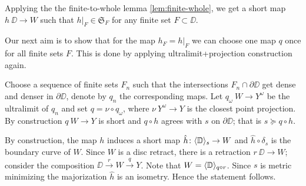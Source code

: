 Applying the the finite-to-whole lemma \ref{lem:finite-whole},
we get a short map $h\:\DD\to W$ such that $h|_F\in \mathfrak{S}_F$
for any finite set $F\subset \DD$.

Our next aim is to show that for the map $h_F=h|_F$ we can choose one map $q$ once for all finite sets $F$.
This is done by applying ultralimit+projection construction again.

Choose a sequence of finite sets $F_n$ such that the intersections $F_n\cap\partial \DD$ get dense and denser in $\partial \DD$, denote by $q_n$ the corresponding maps.
Let $q_\omega\:W\to Y^\omega$ be the ultralimit of $q_n$ and set $q=\nu\circ q_\omega$,
where $\nu\:Y^\omega\to Y$ is the closest point projection.
By construction $q\:W\to Y$ is short and $q\circ h$ agrees with $s$ on $\partial \DD$;
that is $s\succcurlyeq q\circ h$.

By construction, the map $h$ induces a short map $\hat h\colon\langle\mathbb{D}\rangle_s\to W$ and $\hat h\circ\delta_s$ is the boundary curve of $W$.
Since $W$ is a disc retract, there is a retraction $r\:\DD\to W$;
consider the composition $\DD\xrightarrow{r}W\xrightarrow{q} Y$.
Note that  $W=\langle\mathbb{D}\rangle_{q\circ r}$.
Since $s$ is metric minimizing the majorization $\hat h$ is an isometry.
Hence the statement follows.
\qeds